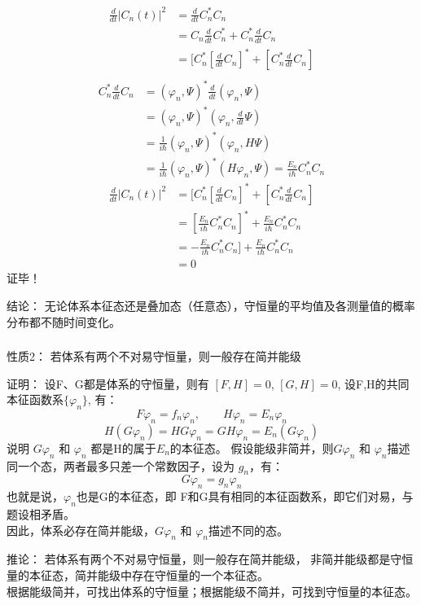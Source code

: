 \begin{frame} [allowframebreaks=]
    $$\begin{aligned}
      \frac{d}{dt} |C_n(t)|^2 &= \frac{d}{dt} C_n^* C_n \\
      &=C_n \frac{d}{dt} C_n^*  +  C_n^*\frac{d}{dt}C_n \\
      &=[C_n^*[\frac{d}{dt} C_n]^*  +  [C_n^*\frac{d}{dt}C_n] \\
    \end{aligned}$$
    $$\begin{aligned}
      C_n^*\frac{d}{dt}C_n&= (\varphi_n, \Psi)^* \frac{d}{dt}(\varphi_n, \Psi) \\
      &= (\varphi_n, \Psi)^* (\varphi_n, \frac{d}{dt}\Psi) \\
      &= \frac{1}{i\hbar}(\varphi_n, \Psi)^* (\varphi_n, H\Psi) \\
      &= \frac{1}{i\hbar}(\varphi_n, \Psi)^* (H\varphi_n, \Psi) = \frac{E_n}{i\hbar}C_n ^* C_n 
    \end{aligned}$$
    $$\begin{aligned}
        \frac{d}{dt} |C_n(t)|^2 &= [C_n^*[\frac{d}{dt} C_n]^*  +  [C_n^*\frac{d}{dt}C_n] \\
        &= [\frac{E_n}{i\hbar}C_n ^* C_n ]^* + \frac{E_n}{i\hbar}C_n ^* C_n \\
        &= -\frac{E_n}{i\hbar}C_n ^* C_n ] + \frac{E_n}{i\hbar}C_n ^* C_n \\
        &=0
    \end{aligned}$$
      证毕！
    \begin{tcolorbox2}{结论：}
        无论体系本征态还是叠加态（任意态），守恒量的平均值及各测量值的概率分布都不随时间变化。         
    \end{tcolorbox2}
\end{frame}

\begin{frame} [allowframebreaks=]
    \frametitle{} 
    \begin{tcolorbox1}{性质2：}
        若体系有两个不对易守恒量，则一般存在简并能级
    \end{tcolorbox1}
    \alert{证明：} 设F、G都是体系的守恒量，则有 $[F,H]=0$, $[G,H]=0$, 设F,H的共同本征函数系$\{\varphi_n\}$, 有：\\ 
    $$F\varphi_n =f_n \varphi_n, \qquad H\varphi_n =E_n \varphi_n $$
    $$H(G\varphi_n) =HG\varphi_n=GH\varphi_n= E_n (G\varphi_n)$$
    说明 $G\varphi_n$ 和 $\varphi_n$ 都是H的属于$E_n$的本征态。
    假设能级非简并，则$G\varphi_n$ 和 $\varphi_n$描述同一个态，两者最多只差一个常数因子，设为 $g_n$，有：
    $$G\varphi_n=g_n \varphi_n$$
    也就是说，$\varphi_n$也是G的本征态，即 F和G具有相同的本征函数系，即它们对易，与题设相矛盾。\\
    因此，体系必存在简并能级，$G\varphi_n$ 和 $\varphi_n$描述不同的态。
    \begin{tcolorbox2}{推论：}
        若体系有两个不对易守恒量，则一般存在简并能级， 非简并能级都是守恒量的本征态，简并能级中存在守恒量的一个本征态。\\
        根据能级简并，可找出体系的守恒量；根据能级不简并，可找到守恒量的本征态。
    \end{tcolorbox2}
\end{frame}

